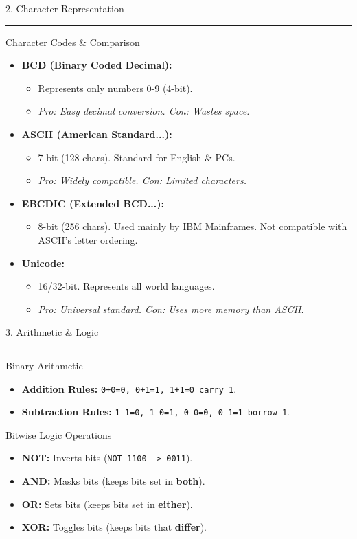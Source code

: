 \documentclass[a4paper, 8pt]{extarticle}
\newcommand{\sectionheading}[1]{%
  \par\vspace{0.7em}
  {\headingfont\fontsize{10.5pt}{11.5pt}\selectfont\color{black}#1}\par\nopagebreak
  \rule{\linewidth}{0.4pt}\vspace{0.2em}\nopagebreak
}
\newcommand{\subsectionheading}[1]{%
  \par\vspace{0.4em}\nopagebreak
  {\headingfont\fontsize{9pt}{10pt}\selectfont\color{black!80}#1}\par\nopagebreak\vspace{-0.3em}
}
\begin{document}
\begin{multicols}{2}
\sectionheading{2. Character Representation}
\subsectionheading{Character Codes \& Comparison}
\begin{itemize}
    \item \textbf{BCD (Binary Coded Decimal):}
        \begin{itemize}
            \item Represents only numbers 0-9 (4-bit).
            \item \textit{Pro: Easy decimal conversion. Con: Wastes space.}
        \end{itemize}
    \item \textbf{ASCII (American Standard...):}
        \begin{itemize}
            \item 7-bit (128 chars). Standard for English \& PCs.
            \item \textit{Pro: Widely compatible. Con: Limited characters.}
        \end{itemize}
    \item \textbf{EBCDIC (Extended BCD...):}
        \begin{itemize}
            \item 8-bit (256 chars). Used mainly by IBM Mainframes. Not compatible with ASCII's letter ordering.
        \end{itemize}
    \item \textbf{Unicode:}
        \begin{itemize}
            \item 16/32-bit. Represents all world languages.
            \item \textit{Pro: Universal standard. Con: Uses more memory than ASCII.}
        \end{itemize}
\end{itemize}

\sectionheading{3. Arithmetic \& Logic}
\subsectionheading{Binary Arithmetic}
\begin{itemize}
    \item \textbf{Addition Rules:} \texttt{0+0=0, 0+1=1, 1+1=0 carry 1}.
    \item \textbf{Subtraction Rules:} \texttt{1-1=0, 1-0=1, 0-0=0, 0-1=1 borrow 1}.
\end{itemize}
\subsectionheading{Bitwise Logic Operations}
\begin{itemize}
    \item \textbf{NOT:} Inverts bits (\texttt{NOT 1100 -> 0011}).
    \item \textbf{AND:} Masks bits (keeps bits set in \textbf{both}).
    \item \textbf{OR:} Sets bits (keeps bits set in \textbf{either}).
    \item \textbf{XOR:} Toggles bits (keeps bits that \textbf{differ}).
\end{itemize}


\end{multicols}
\end{document}
